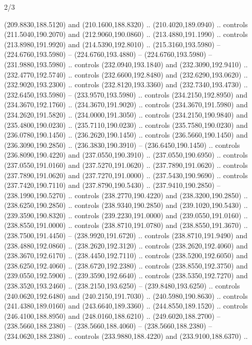 \begin{flagdescription}{2/3}
\begin{scope}[xshift=0.5\flaglength,yshift=0.5\flagwidth,scale=\flagwidth/259.2]
\begin{scope}[y=0.8pt, x=0.8pt, yscale=-1,shift={(-243,-162)}]
      (209.8830,188.5120) and (210.1600,188.8320) .. (210.4020,189.0940) .. controls
      (211.5040,190.2070) and (212.9060,190.0860) .. (213.4880,191.1990) .. controls
      (213.8980,191.9920) and (214.5390,192.8010) .. (215.3160,193.5980) --
      (224.6760,193.5980) -- (224.6760,193.4880) -- (224.6760,193.5980) --
      (231.9880,193.5980) .. controls (232.0940,193.1840) and (232.3090,192.9410) ..
      (232.4770,192.5740) .. controls (232.6600,192.8480) and (232.6290,193.0620) ..
      (232.9020,193.2300) .. controls (232.8120,193.3360) and (232.7340,193.4730) ..
      (232.6450,193.5980) -- (233.9570,193.5980) .. controls (234.2150,192.8950) and
      (234.3670,192.1760) .. (234.3670,191.9020) .. controls (234.3670,191.5980) and
      (234.2620,191.5820) .. (234.0000,191.3050) .. controls (234.2150,190.9840) and
      (235.4800,190.0230) .. (235.7110,190.0230) .. controls (235.7580,190.0230) and
      (236.0780,190.1450) .. (236.2620,190.1450) .. controls (236.5660,190.1450) and
      (236.3090,190.2850) .. (236.3830,190.3910) -- (236.6450,190.1450) .. controls
      (236.8090,190.4220) and (237.0550,190.3910) .. (237.0550,190.6950) .. controls
      (237.0550,191.0160) and (237.5270,191.0620) .. (237.7890,191.0620) .. controls
      (237.7890,191.0620) and (237.7270,191.0000) .. (237.5430,190.9690) .. controls
      (237.7420,190.7110) and (237.8790,190.5430) .. (237.9410,190.2850) --
      (238.1990,190.5270) .. controls (238.2770,190.4220) and (238.3200,190.2850) ..
      (238.6250,190.2850) .. controls (238.9340,190.2850) and (239.1020,190.5430) ..
      (239.3590,190.8320) .. controls (239.2230,191.0000) and (239.0550,191.0160) ..
      (238.8550,191.0000) .. controls (238.8710,191.0780) and (238.8550,191.3670) ..
      (238.7500,191.4450) -- (238.9920,191.6720) .. controls (238.8710,191.9490) and
      (238.4880,192.0860) .. (238.2620,192.3120) .. controls (238.2620,192.4060) and
      (238.3670,192.6170) .. (238.4450,192.7110) .. controls (238.5200,192.6050) and
      (238.6250,192.4060) .. (238.6720,192.2380) .. controls (238.8550,192.3750) and
      (239.0550,192.5900) .. (239.3590,192.6640) .. controls (238.5350,192.7270) and
      (238.3520,193.2460) .. (238.2150,193.6250) -- (239.8480,193.6250) .. controls
      (240.0620,192.6480) and (240.2150,191.7030) .. (240.5980,190.8630) .. controls
      (241.4380,189.0160) and (243.6640,189.3360) .. (244.8550,189.1520) .. controls
      (246.4100,188.8950) and (248.0160,188.6210) .. (249.6020,188.2700) --
      (238.5660,188.2380) -- (238.5660,188.4060) -- (238.5660,188.2380) --
      (234.0620,188.2380) .. controls (233.9880,188.4220) and (233.9100,188.6370) ..

\end{scope}
\end{scope}
\end{flagdescription}
